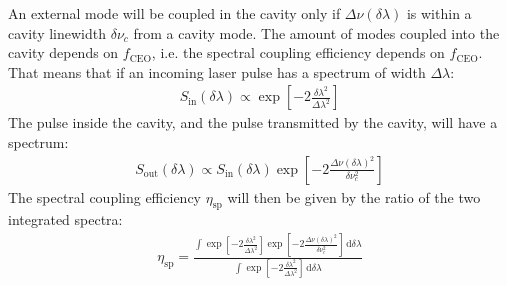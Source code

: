 An external mode will be coupled in the cavity only if $\Delta\nu(\delta\lambda)$ is within a cavity linewidth $\delta\nu_c$ from a cavity mode. The amount of modes coupled into the cavity depends on $f_\mathrm{CEO}$, i.e. the spectral coupling efficiency depends on $f_\mathrm{CEO}$. That means that if an incoming laser pulse has a spectrum of width $\Delta \lambda$:
\begin{align}
	S_\mathrm{in}(\delta\lambda) \propto \exp[-2 \frac{\delta\lambda^2}{\Delta\lambda^2}]
\end{align}
The pulse inside the cavity, and the pulse transmitted by the cavity, will have a spectrum:
\begin{align}
	S_\mathrm{out}(\delta\lambda) \propto S_\mathrm{in}(\delta\lambda)  \exp[-2\frac{\Delta\nu(\delta\lambda)^2}{\delta\nu_c^2}] 
\end{align}
The spectral coupling efficiency $\eta_\mathrm{sp}$ will then be given by the ratio of the two integrated spectra:
\begin{align}
	\eta_\mathrm{sp} = \frac{\int \exp[-2 \frac{\delta\lambda^2}{\Delta\lambda^2}]\exp[-2\frac{\Delta\nu(\delta\lambda)^2}{\delta\nu_c^2}]\,\mathrm{d}\delta\lambda}{\int \exp[-2 \frac{\delta\lambda^2}{\Delta\lambda^2}]\,\mathrm{d}\delta\lambda}
\end{align}

